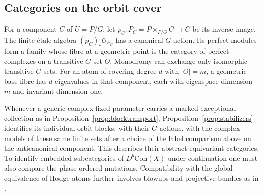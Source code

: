 

\subsection{Categories on the orbit cover}
For a component $C$ of $\widetilde U=P/G$, let $p_C\colon P_C=P\times_{P/G}C\to C$ be its inverse image. The finite étale algebra $(p_C)_*\mathcal O_{P_C}$ has a canonical $G$-action. Its perfect modules form a family whose fibre at a geometric point is the category of perfect complexes on a transitive $G$-set $O$. Monodromy can exchange only isomorphic transitive $G$-sets. For an atom of covering degree $d$ with $|O|=m$, a geometric base fibre has $d$ eigenvalues in that component, each with eigenspace dimension $m$ and invariant dimension one.

Whenever a generic complex fixed parameter carries a marked exceptional collection as in Proposition~\ref{prop:blocktransport}, Proposition~\ref{prop:stabilizers} identifies its individual orbit blocks, with their $G$-actions, with the complex models of these same finite sets after a choice of the label comparison above on the anticanonical component. This describes their abstract equivariant categories. To identify embedded subcategories of $D^b\mathrm{Coh}(X)$ under continuation one must also compare the phase-ordered mutations. Compatibility with the global equivalence of Hodge atoms further involves blowups and projective bundles as in \cite[\S2.5]{CKK}.
